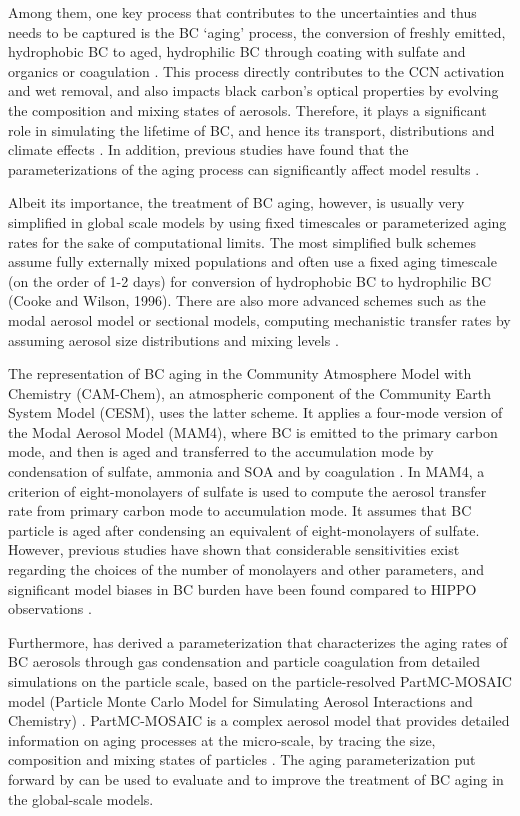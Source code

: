 \documentclass[12pt, fullpage]{uiucthesis2009}
\begin{document}
	Among them, one key process that contributes to the uncertainties and thus needs to be captured is the BC ‘aging’ process, the conversion of freshly emitted, hydrophobic BC to aged, hydrophilic BC through coating with sulfate and organics or coagulation \citep[][]{langner1992periodicity,parungo1994aeolian,liousse1996global}. This process directly contributes to the CCN activation and wet removal, and also impacts black carbon's optical properties by evolving the composition and mixing states of aerosols. Therefore, it plays a significant role in simulating the lifetime of BC, and hence its transport, distributions and climate effects \citep[e.g.][]{croft2005black,riemer2004soot}. In addition, previous studies have found that the parameterizations of the aging process can significantly affect model results \citep{Liu2010}.
	
	Albeit its importance, the treatment of BC aging, however, is usually very simplified in global scale models by using fixed timescales or parameterized aging rates for the sake of computational limits. The most simplified bulk schemes assume fully externally mixed populations and often use a fixed aging timescale (on the order of 1-2 days) for conversion of hydrophobic BC to hydrophilic BC (Cooke and Wilson, 1996). There are also more advanced schemes such as the modal aerosol model or sectional models, computing mechanistic transfer rates by assuming aerosol size distributions and mixing levels \citep[e.g.][]{bauer2013historical,huang2013enrichment}. 
	
	The representation of BC aging in the Community Atmosphere Model with Chemistry (CAM-Chem), an atmospheric component of the Community Earth System Model (CESM), uses the latter scheme. It applies a four-mode version of the Modal Aerosol Model (MAM4), where BC is emitted to the primary carbon mode, and then is aged and transferred to the accumulation mode by condensation of sulfate, ammonia and SOA and by coagulation \citep[e.g.][]{Liu2012,Lamarque2012}. In MAM4, a criterion of eight-monolayers of sulfate is used to compute the aerosol transfer rate from primary carbon mode to accumulation mode. It assumes that BC particle is aged after condensing an equivalent of eight-monolayers of sulfate. However, previous studies have shown that considerable sensitivities exist regarding the choices of the number of monolayers and other parameters, and significant model biases in BC burden have been found compared to HIPPO observations \citep{Liu2010}. 
	
	Furthermore, \citet{Fierce2016} has derived a parameterization that characterizes the aging rates of BC aerosols through gas condensation and particle coagulation from detailed simulations on the particle scale, based on the particle-resolved PartMC-MOSAIC model (Particle Monte Carlo Model for Simulating Aerosol Interactions and Chemistry) \citep{Fierce2016}. PartMC-MOSAIC is a complex aerosol model that provides detailed information on aging processes at the micro-scale, by tracing the size, composition and mixing states of particles \citep{riemer2010introducing}. The aging parameterization put forward by \citet{Fierce2016} can be used to evaluate and to improve the treatment of BC aging in the global-scale models. 
	
\end{document}

